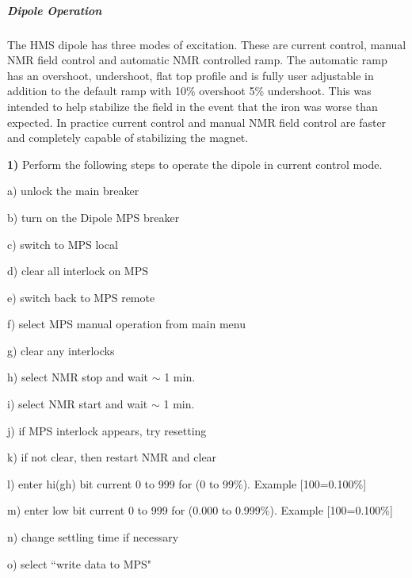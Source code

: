 {\subparagraph{Dipole Operation}

\begin{description}
\item{}\hskip0.3in The HMS dipole has three modes of excitation. These are
current control, manual NMR field control and automatic NMR controlled ramp.
The automatic ramp has an overshoot, undershoot, flat top profile and is
fully user adjustable in addition to the default ramp with 10\%
overshoot 5\% undershoot.  This was intended to help stabilize the field
in the event that the iron was worse than expected.  In practice current
control and manual NMR field control are faster and completely capable
of stabilizing the magnet.
\end{description}

\begin{description}
\item{\hskip0.3in \bf 1)}\hskip0.1in Perform the following steps to
operate the
dipole in current control mode.
\end{description}

\begin{description}
\item{}\hskip0.5in a) unlock the main breaker
\item{}\hskip0.5in b) turn on the Dipole MPS breaker
\item{}\hskip0.5in c) switch to MPS local
\item{}\hskip0.5in d) clear all interlock on MPS
\item{}\hskip0.5in e) switch back to MPS remote
\item{}\hskip0.5in f) select MPS manual operation from main menu
\item{}\hskip0.5in g) clear any interlocks
\item{}\hskip0.5in h) select NMR stop and wait $\sim$ 1 min.
\item{}\hskip0.5in i) select NMR start and wait $\sim$ 1 min.
\item{}\hskip0.5in j) if MPS interlock appears, try resetting
\item{}\hskip0.5in k) if not clear, then restart NMR and clear
\item{}\hskip0.5in l) enter hi(gh) bit current 0 to 999 for (0 to 99\%).  Example
[100=0.100\%]
\item{}\hskip0.5in m) enter low bit current 0 to 999 for (0.000 to 0.999\%).
Example [100=0.100\%]
\item{}\hskip0.5in n) change settling time if necessary
\item{}\hskip0.5in o) select ``write data to MPS"
\end{description}


}
